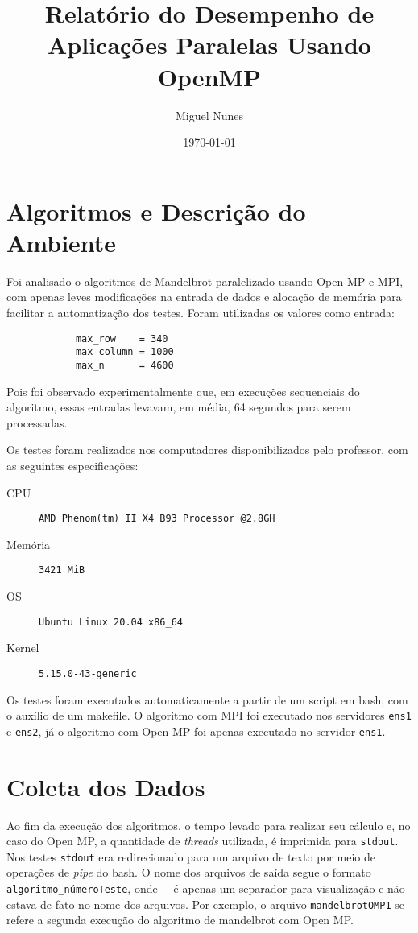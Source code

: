 \documentclass[10pt,a4paper]{article}
\title{Relatório do Desempenho de Aplicações Paralelas Usando OpenMP}
\author{Miguel Nunes}
\date{\today}
\begin{document}
	\maketitle

	\section{Algoritmos e Descrição do Ambiente}

		Foi analisado o algoritmos de Mandelbrot paralelizado usando Open MP e MPI, 
		com apenas leves modificações na entrada de dados e alocação de memória para facilitar a automatização dos testes.
		Foram utilizadas os valores como entrada: 
		
		\begin{verbatim}
			max_row    = 340
			max_column = 1000
			max_n      = 4600
		\end{verbatim}

		Pois foi observado experimentalmente que, em execuções sequenciais do algoritmo, essas entradas levavam, em média, 
		64 segundos para serem processadas.

		Os testes foram realizados nos computadores disponibilizados pelo professor, com as seguintes especificações:

		\begin{description}
			\item[CPU] \texttt{AMD Phenom(tm) II X4 B93 Processor @2.8GH}
			\item[Memória] \texttt{3421 MiB}
			\item[OS] \texttt{Ubuntu Linux 20.04 x86\_64}
			\item[Kernel] \texttt{5.15.0-43-generic}
		\end{description}

		Os testes foram executados automaticamente a partir de um script em bash, com o auxílio de um makefile.
		O algoritmo com MPI foi executado nos servidores \texttt{ens1} e \texttt{ens2}, já o algoritmo com Open MP foi apenas executado
		no servidor \texttt{ens1}.

	\section{Coleta dos Dados}
		
		Ao fim da execução dos algoritmos, o tempo levado para realizar seu cálculo e, no caso do Open MP, a 
		quantidade de \textit{threads} utilizada, é imprimida para \texttt{stdout}. 
		Nos testes \texttt{stdout} era redirecionado para um arquivo de texto por meio de 
		operações de \textit{pipe} do bash. O nome dos arquivos de saída segue o formato \break \texttt{algoritmo\_númeroTeste}, 
		onde \_ é apenas um separador para visualização e não estava de fato no nome dos arquivos.
		Por exemplo, o arquivo \texttt{mandelbrotOMP1} se refere a segunda execução do algoritmo de mandelbrot com Open MP.
\end{document}
